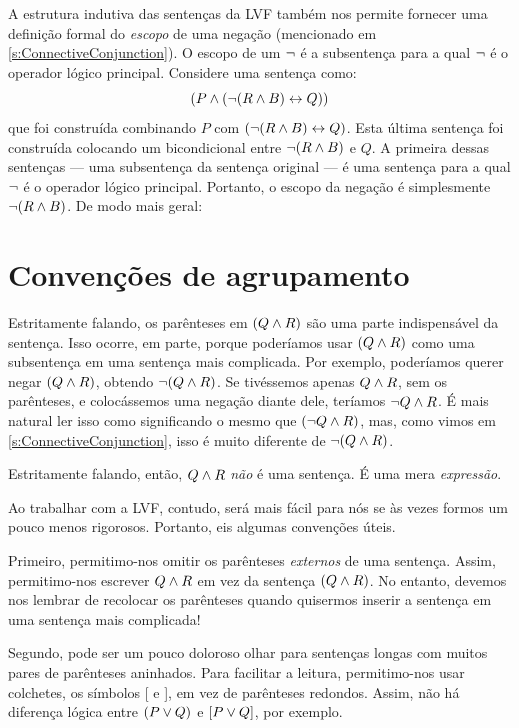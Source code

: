 A estrutura indutiva das sentenças da LVF também nos permite fornecer uma
definição formal do \emph{escopo} de uma negação (mencionado em
\cref{s:ConnectiveConjunction}). O escopo de um $\neg$ é a subsentença
para a qual $\neg$ é o operador lógico principal. Considere uma sentença
como:
$$(P \wedge (\neg (R \wedge B) \leftrightarrow Q))$$
que foi construída combinando $P$ com
$ (\neg (R \wedge B) \leftrightarrow Q)$. Esta última sentença foi construída
colocando um bicondicional entre $\neg (R \wedge B)$ e $Q$. A primeira
dessas sentenças — uma subsentença da sentença original — é uma sentença
para a qual $\neg$ é o operador lógico principal. Portanto, o escopo da
negação é simplesmente $\neg(R \wedge B)$. De modo mais geral:


\section{Convenções de agrupamento}
\label{TFLconventions}
Estritamente falando, os parênteses em $(Q \wedge R)$ são uma parte
indispensável da sentença. Isso ocorre, em parte, porque poderíamos usar
$(Q \wedge R)$ como uma subsentença em uma sentença mais complicada. Por
exemplo, poderíamos querer negar $(Q \wedge R)$, obtendo
$\neg(Q \wedge R)$. Se tivéssemos apenas $Q \wedge R$, sem os parênteses,
e colocássemos uma negação diante dele, teríamos
$\neg Q \wedge R$. É mais natural ler isso como significando o mesmo que
$(\neg Q \wedge R)$, mas, como vimos em \cref{s:ConnectiveConjunction},
isso é muito diferente de $\neg(Q\wedge R)$.

Estritamente falando, então, $Q \wedge R$ \emph{não} é uma sentença. É
uma mera \emph{expressão}.

Ao trabalhar com a LVF, contudo, será mais fácil para nós se às vezes
formos um pouco menos rigorosos. Portanto, eis algumas convenções úteis.

Primeiro, permitimo-nos omitir os parênteses \emph{externos} de uma
sentença. Assim, permitimo-nos escrever $Q \wedge R$ em vez da sentença
$(Q \wedge R)$. No entanto, devemos nos lembrar de recolocar os
parênteses quando quisermos inserir a sentença em uma sentença mais
complicada!

Segundo, pode ser um pouco doloroso olhar para sentenças longas com
muitos pares de parênteses aninhados. Para facilitar a leitura,
permitimo-nos usar colchetes, os símbolos [ e ], em vez de parênteses redondos.
Assim, não há diferença lógica entre $(P\vee Q)$ e $[P\vee Q]$, por
exemplo.

